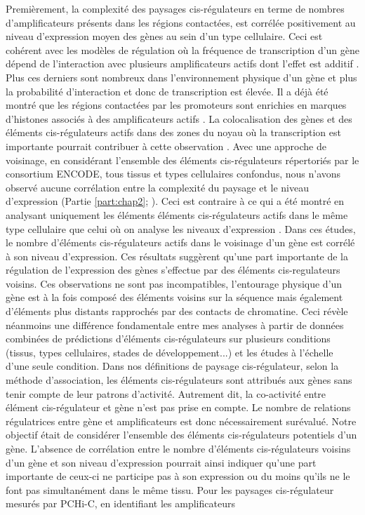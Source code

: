 Premièrement, la complexité des paysages \gls{cis}-régulateurs en terme de nombres d’\glspl{amplificateur} présents dans les régions contactées, est corrélée positivement au niveau d’expression moyen des gènes au sein d’un type cellulaire. Ceci est cohérent avec les modèles de régulation où la fréquence de transcription d’un gène dépend de l’interaction avec plusieurs \glspl{amplificateur} actifs dont l’effet est additif \citep{mifsud_mapping_2015, schoenfelder_pluripotent_2015, javierre_lineage-specific_2016}. Plus ces derniers sont nombreux dans l’environnement physique d’un gène et plus la probabilité d’interaction et donc de transcription est élevée. Il a déjà été montré que les régions contactées par les promoteurs sont enrichies en marques d’histones associés à des \glspl{amplificateur} actifs \citep{javierre_lineage-specific_2016}. La colocalisation des gènes et des éléments \gls{cis}-régulateurs actifs dans des zones du noyau où la transcription est importante pourrait contribuer à cette observation \citep{sutherland_transcription_2009}. Avec une approche de voisinage, en considérant l’ensemble des éléments \gls{cis}-régulateurs répertoriés par le consortium ENCODE, tous tissus et types cellulaires confondus, nous n’avons observé aucune corrélation entre la complexité du paysage et le niveau d’expression (Partie \ref{part:chap2}; \citet{laverre_long-range_2022}). Ceci est contraire à ce qui a été montré en analysant uniquement les éléments éléments \gls{cis}-régulateurs actifs dans le même type cellulaire que celui où on analyse les niveaux d'expression \citep{berthelot_complexity_2018, naville_long-range_2015}. Dans ces études, le nombre d’éléments \gls{cis}-régulateurs actifs dans le voisinage d’un gène est corrélé à son niveau d’expression. Ces résultats suggèrent qu'une part importante de la régulation de l'expression des gènes s'effectue par des éléments \gls{cis}-regulateurs voisins. Ces observations ne sont pas incompatibles, l’entourage physique d’un gène est à la fois composé des éléments voisins sur la séquence mais également d’éléments plus distants rapprochés par des contacts de chromatine. Ceci révèle néanmoins une différence fondamentale entre mes analyses à partir de données combinées de prédictions d’éléments \gls{cis}-régulateurs sur plusieurs \glspl{condition} (tissus, types cellulaires, stades de développement...) et les études à l’échelle d’une seule \gls{condition}. Dans nos définitions de paysage \gls{cis}-régulateur, selon la méthode d’association, les éléments \gls{cis}-régulateurs sont attribués aux gènes sans tenir compte de leur patrons d'activité. Autrement dit, la co-activité entre élément \gls{cis}-régulateur et gène n’est pas prise en compte. Le nombre de relations régulatrices entre gène et \glspl{amplificateur} est donc nécessairement surévalué. Notre objectif était de considérer l’ensemble des éléments \gls{cis}-régulateurs potentiels d’un gène. L’absence de corrélation entre le nombre d’éléments \gls{cis}-régulateurs voisins d’un gène et son niveau d’expression pourrait ainsi indiquer qu’une part importante de ceux-ci ne participe pas à son expression ou du moins qu’ils ne le font pas simultanément dans le même tissu. Pour les paysages \gls{cis}-régulateur mesurés par \acrshort{PCHi-C}, en identifiant les \glspl{amplificateur} 